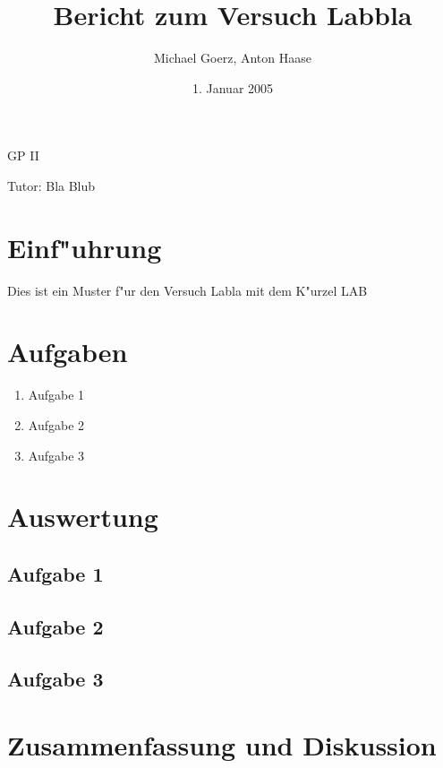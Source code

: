 \documentclass[a4paper,10pt]{article}
\title{Bericht zum Versuch Labbla}
\author{Michael Goerz, Anton Haase}
\date{1. Januar 2005}
\begin{document}
\maketitle
\noindent GP II

\noindent Tutor: Bla Blub

\section{Einf"uhrung}
Dies ist ein Muster f"ur den Versuch Labla mit dem K"urzel LAB



\section{Aufgaben}
\begin{enumerate}
\item Aufgabe 1 
\item Aufgabe 2
\item Aufgabe 3
\end{enumerate}



\clearpage


\section{Auswertung}

\subsection{Aufgabe 1}

\subsection{Aufgabe 2}

\subsection{Aufgabe 3}




\section{Zusammenfassung und Diskussion}
\end{document}
